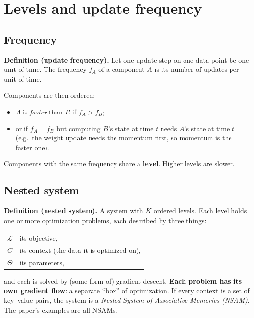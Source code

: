 \documentclass[11pt,a4paper]{article}
\newcommand{\Lc}{\mathcal{L}}
\begin{document}
\section{Levels and update frequency}

\subsection{Frequency}
\textbf{Definition (update frequency).} Let one update step on one data point be one unit of time. The frequency $f_A$ of a component $A$ is its number of updates per unit of time.

Components are then ordered:
\begin{itemize}
  \item $A$ is \emph{faster} than $B$ if $f_A > f_B$;
  \item or if $f_A = f_B$ but computing $B$'s state at time $t$ needs $A$'s state at time $t$ (e.g.\ the weight update needs the momentum first, so momentum is the faster one).
\end{itemize}
Components with the same frequency share a \textbf{level}. Higher levels are slower.

\subsection{Nested system}
\textbf{Definition (nested system).} A system with $K$ ordered levels. Each level holds one or more optimization problems, each described by three things:
\begin{center}
\begin{tabular}{ll}
  $\Lc$ & its objective,\\
  $C$ & its context (the data it is optimized on),\\
  $\Theta$ & its parameters,
\end{tabular}
\end{center}
and each is solved by (some form of) gradient descent. \textbf{Each problem has its own gradient flow}: a separate ``box'' of optimization. If every context is a set of key--value pairs, the system is a \emph{Nested System of Associative Memories (NSAM)}. The paper's examples are all NSAMs.
\end{document}
